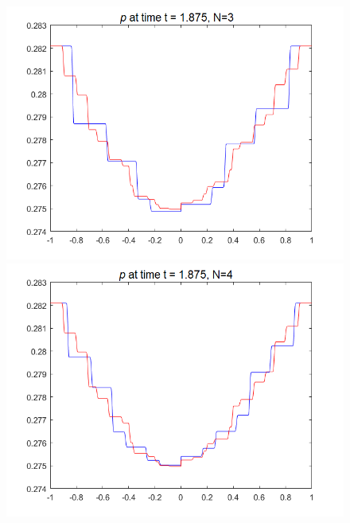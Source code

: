 \begin{frame}
\begin{figure}[H]
		\hfill
		\begin{minipage}{0.32\textwidth}
			\includegraphics[width=\textwidth]{Bilder_wx/Wavepropa/red=12th_blue=6th_wx=1_leftDr1_rightDr2_Awp12th}
		\end{minipage}
		\vfill
		\begin{minipage}{0.32\textwidth}
			\includegraphics[width=\textwidth]{Bilder_wx/Wavepropa/red=12th_blue=8th_wx=1_leftDr1_rightDr2_Awp12th}
		\end{minipage}
		\hfill
		\begin{minipage}{0.32\textwidth}

\end{minipage}
\end{figure}
\end{frame}

